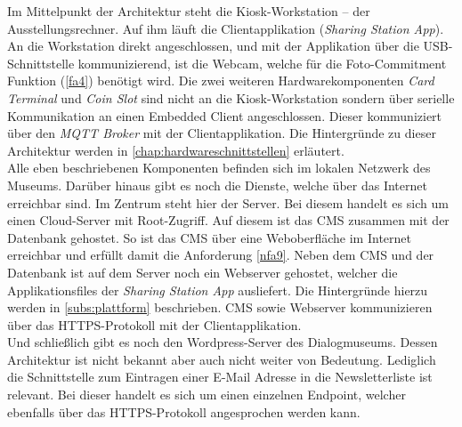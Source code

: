 Im Mittelpunkt der Architektur steht die Kiosk-Workstation -- der Ausstellungsrechner. Auf ihm läuft
die Clientapplikation (\emph{Sharing Station App}). An die Workstation direkt angeschlossen, und mit der
Applikation über die USB-Schnittstelle kommunizierend, ist die Webcam, 
welche für die Foto-Commitment Funktion (\ref{fa4}) benötigt wird. 
Die zwei weiteren Hardwarekomponenten \emph{Card Terminal} und \emph{Coin Slot} sind nicht 
an die Kiosk-Workstation sondern über serielle Kommunikation an einen Embedded Client angeschlossen. 
Dieser kommuniziert über
den \emph{MQTT Broker} mit der Clientapplikation. Die Hintergründe zu dieser Architektur werden in
\autoref{chap:hardwareschnittstellen} erläutert.\\
Alle eben beschriebenen Komponenten befinden sich im lokalen Netzwerk des Museums. Darüber hinaus gibt 
es noch die Dienste, welche über das Internet erreichbar sind. Im Zentrum steht hier der Server. 
Bei diesem handelt es sich um einen Cloud-Server mit Root-Zugriff. Auf diesem ist das CMS zusammen mit
der Datenbank gehostet. So ist das CMS über eine Weboberfläche im Internet erreichbar und erfüllt
damit die Anforderung \ref{nfa9}. Neben dem CMS und der Datenbank ist auf dem Server noch ein
Webserver gehostet, welcher die Applikationsfiles der \emph{Sharing
Station App} ausliefert. Die Hintergründe hierzu werden in \autoref{subs:plattform} beschrieben.
CMS sowie Webserver kommunizieren über das HTTPS-Protokoll mit der Clientapplikation.\\
Und schließlich gibt es noch den Wordpress-Server des Dialogmuseums. Dessen Architektur ist nicht bekannt 
aber auch nicht weiter von Bedeutung. Lediglich die Schnittstelle zum Eintragen einer E-Mail Adresse in 
die Newsletterliste ist relevant. Bei dieser handelt es sich um einen einzelnen Endpoint, welcher ebenfalls
über das HTTPS-Protokoll angesprochen werden kann. 